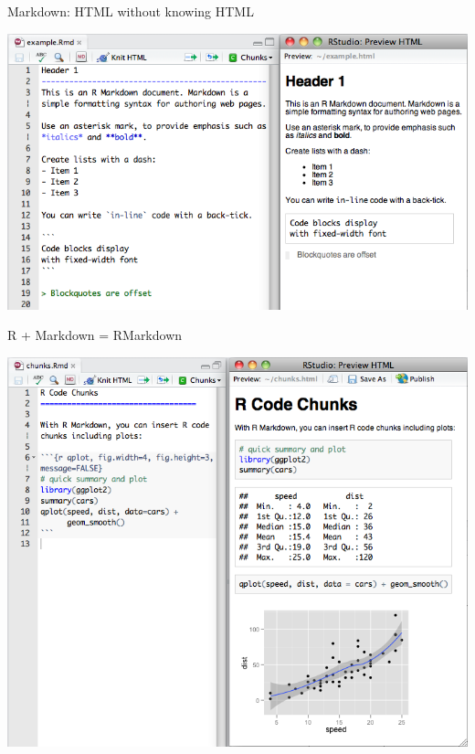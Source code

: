 \documentclass[10pt]{beamer}\usepackage[]{graphicx}\usepackage[]{color}
\begin{document}
\begin{frame}{Markdown: HTML without knowing HTML}
\begin{center}
\includegraphics[scale=0.45, keepaspectratio]{markdown}
\end{center}
\end{frame}

\begin{frame}{R + Markdown = RMarkdown}
\begin{center}
\includegraphics[scale=0.36, keepaspectratio]{rmarkdown}
\end{center}
\end{frame}
\end{document}
